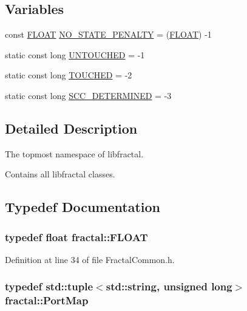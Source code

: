 \subsection*{Variables}
\begin{DoxyCompactItemize}
\item 
const \hyperlink{namespacefractal_a1c2d2530689575d5ccb56bae52af70d3}{F\+L\+O\+A\+T} \hyperlink{namespacefractal_abf28c8af1594ddabd026166384d71f3d}{N\+O\+\_\+\+S\+T\+A\+T\+E\+\_\+\+P\+E\+N\+A\+L\+T\+Y} = (\hyperlink{namespacefractal_a1c2d2530689575d5ccb56bae52af70d3}{F\+L\+O\+A\+T}) -\/1
\item 
static const long \hyperlink{namespacefractal_a4a8aba0e06362fc4539e2bd952ca11b5}{U\+N\+T\+O\+U\+C\+H\+E\+D} = -\/1
\item 
static const long \hyperlink{namespacefractal_affbd8e698e8d877464a1ac3be5d2a758}{T\+O\+U\+C\+H\+E\+D} = -\/2
\item 
static const long \hyperlink{namespacefractal_a3287683802bb03d81549392013a9c759}{S\+C\+C\+\_\+\+D\+E\+T\+E\+R\+M\+I\+N\+E\+D} = -\/3
\end{DoxyCompactItemize}


\subsection{Detailed Description}
The topmost namespace of libfractal. 

Contains all libfractal classes. 

\subsection{Typedef Documentation}
\hypertarget{namespacefractal_a1c2d2530689575d5ccb56bae52af70d3}{
\subsubsection[{F\+L\+O\+A\+T}]{\setlength{\rightskip}{0pt plus 5cm}typedef float {\bf fractal\+::\+F\+L\+O\+A\+T}}}\label{namespacefractal_a1c2d2530689575d5ccb56bae52af70d3}


Definition at line 34 of file Fractal\+Common.\+h.

\hypertarget{namespacefractal_af1c057caf828f6870c4524aaa6fafc54}{
\subsubsection[{Port\+Map}]{\setlength{\rightskip}{0pt plus 5cm}typedef std\+::tuple$<$std\+::string, unsigned long$>$ {\bf fractal\+::\+Port\+Map}}}\label{namespacefractal_af1c057caf828f6870c4524aaa6fafc54}


